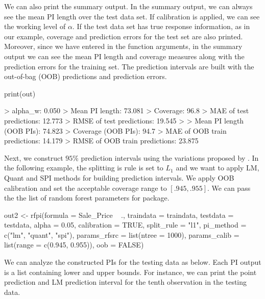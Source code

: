 
We can also print the summary output. In the summary output, we can always see the mean PI length over the test data set. If calibration is applied, we can see the working level of $\alpha$. If the test data set has true response information, as in our example, coverage and prediction errors for the test set are also printed. Moreover, since we have entered  in the function arguments, in the summary output we can see the mean PI length and coverage measures along with the prediction errors for the training set. The prediction intervals are built with the out-of-bag (OOB) predictions and prediction errors.

\begin{example*}
print(out)

>                       alpha_w: 0.050
>                Mean PI length: 73.081
>                      Coverage: 96.8%
>       MAE of test predictions: 12.773
>      RMSE of test predictions: 19.545
> 
>      Mean PI length (OOB PIs): 74.823
>            Coverage (OOB PIs): 94.7%
>  MAE of OOB train predictions: 14.179
> RMSE of OOB train predictions: 23.875
\end{example*}

Next, we construct $95\%$ prediction intervals using the variations proposed by \citet{roy_prediction_2020}. In the following example, the splitting is rule is set to $L_1$ and we want to apply LM, Quant and SPI methods for building prediction intervals. We apply OOB calibration and set the acceptable coverage range to $\left[.945,.955\right]$. We can pass the the list of random forest parameters for  package.

\begin{example*}
out2 <- rfpi(formula = Sale_Price ~ .,
             traindata = traindata, 
             testdata = testdata, 
             alpha = 0.05,
             calibration = TRUE, 
             split_rule = "l1", 
             pi_method = c("lm", "quant", "spi"),
             params_rfsrc = list(ntree = 1000),
             params_calib = list(range = c(0.945, 0.955)),
             oob = FALSE)
\end{example*}

We can analyze the constructed PIs for the testing data as below. Each PI output is a list containing lower and upper bounds. For instance, we can print the point prediction and LM prediction interval for the tenth observation in the testing data.

